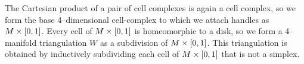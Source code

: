 The Cartesian product of a pair of cell complexes is again a cell complex, so we form the base 4--dimensional cell-complex to which we attach handles as $M\times[0,1]$.
Every cell of $M\times[0,1]$ is homeomorphic to a disk, so we form a 4--manifold triangulation $W$ as a subdivision of $M\times[0,1]$.
This triangulation is obtained by inductively subdividing each cell of $M\times[0,1]$ that is not a simplex.


%
%
%
%
%
%
%
%
